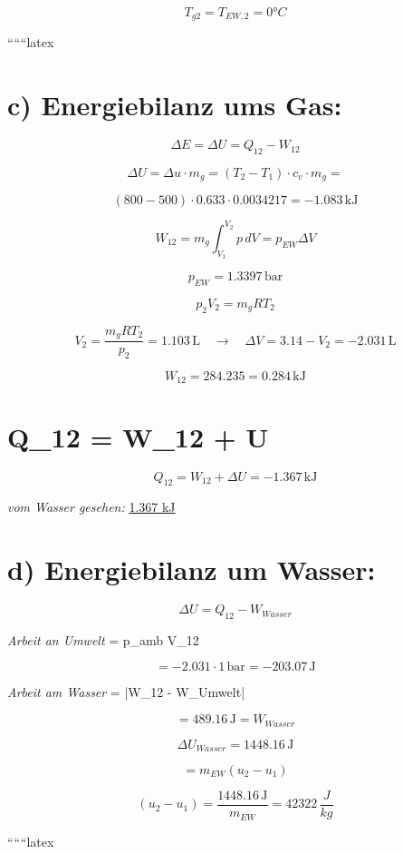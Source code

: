 \[
T_{g2} = T_{EW,2} = 0°C
\]

``````latex


\section*{c) Energiebilanz ums Gas:}

\[
\Delta E = \Delta U = Q_{12} - W_{12}
\]

\[
\Delta U = \Delta u \cdot m_g = (T_2 - T_1) \cdot c_v \cdot m_g = 
\]

\[
(800 - 500) \cdot 0.633 \cdot 0.0034217 = -1.083 \, \text{kJ}
\]

\[
W_{12} = m_g \int_{V_1}^{V_2} p \, dV = p_{EW} \Delta V
\]

\[
p_{EW} = 1.3397 \, \text{bar}
\]

\[
p_2 V_2 = m_g R T_2
\]

\[
V_2 = \frac{m_g R T_2}{p_2} = 1.103 \, \text{L} \quad \longrightarrow \quad \Delta V = 3.14 - V_2 = -2.031 \, \text{L}
\]

\[
W_{12} = 284.235 = 0.284 \, \text{kJ}
\]

\section*{Q_{12} = W_{12} + \Delta U}

\[
Q_{12} = W_{12} + \Delta U = -1.367 \, \text{kJ}
\]

\textit{vom Wasser gesehen:} \underline{1.367 kJ}

\section*{d) Energiebilanz um Wasser:}

\[
\Delta U = Q_{12} - W_{Wasser}
\]

\textit{Arbeit an Umwelt} = p_{amb} \cdot \Delta V_{12}

\[
= -2.031 \cdot 1 \, \text{bar} = -203.07 \, \text{J}
\]

\textit{Arbeit am Wasser} = |W_{12} - W_{Umwelt}|

\[
= 489.16 \, \text{J} = W_{Wasser}
\]

\[
\Delta U_{Wasser} = 1448.16 \, \text{J}
\]

\[
= m_{EW} (u_2 - u_1)
\]

\[
(u_2 - u_1) = \frac{1448.16 \, \text{J}}{m_{EW}} = 42322 \, \frac{J}{kg}
\]

``````latex


